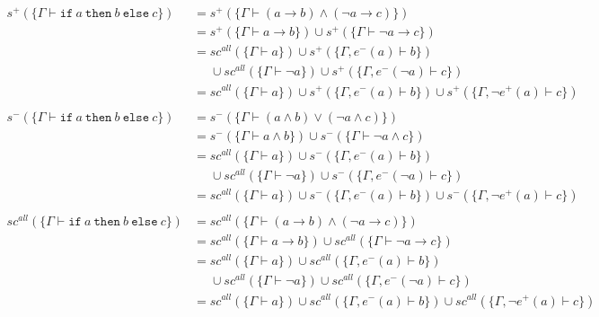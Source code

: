 \documentclass[12pt]{article}
\newcommand{\oif}{\texttt{if}~}
\newcommand{\othen}{~\texttt{then}~}
\newcommand{\oelse}{~\texttt{else}~}
\begin{document}
\begin{align*}
  s^+ (\{\Gamma \vdash \oif a \othen b \oelse c\})
   & = s^+ (\{\Gamma \vdash (a \rightarrow b) \land (\neg a \rightarrow c)\})                                                        \\
   & = s^+ (\{\Gamma \vdash a \rightarrow b\}) \cup s^+ (\{\Gamma \vdash \neg a \rightarrow c\})                                     \\
   & = sc^{all} (\{\Gamma \vdash a\}) \cup s^+ (\{\Gamma, e^- (a) \vdash b\})                                                        \\
   & \phantom{ = {}}{} \cup sc^{all} (\{\Gamma \vdash \neg a\}) \cup s^+ (\{\Gamma, e^- (\neg a) \vdash c\})                         \\
   & = sc^{all} (\{\Gamma \vdash a\}) \cup s^+ (\{\Gamma, e^- (a) \vdash b\}) \cup s^+ (\{\Gamma, \neg e^+ (a) \vdash c\})           \\
  \\
  s^- (\{\Gamma \vdash \oif a \othen b \oelse c\})
   & = s^- (\{\Gamma \vdash (a \land b) \lor (\neg a \land c)\})                                                                     \\
   & = s^- (\{\Gamma \vdash a \land b\}) \cup s^- (\{\Gamma \vdash \neg a \land c\})                                                 \\
   & = sc^{all} (\{\Gamma \vdash a\}) \cup s^- (\{\Gamma, e^- (a)\vdash b\})                                                         \\
   & \phantom{ = {}}{} \cup sc^{all} (\{\Gamma \vdash \neg a\}) \cup s^- (\{\Gamma, e^- (\neg a)\vdash c\})                          \\
   & = sc^{all} (\{\Gamma \vdash a\}) \cup s^- (\{\Gamma, e^- (a)\vdash b\}) \cup s^- (\{\Gamma, \neg e^+ (a)\vdash c\})             \\
  \\
  sc^{all} (\{\Gamma \vdash \oif a \othen b \oelse c\})
   & = sc^{all} (\{\Gamma \vdash (a \rightarrow b) \land (\neg a \rightarrow c)\})                                                   \\
   & = sc^{all} (\{\Gamma \vdash a \rightarrow b\}) \cup sc^{all} (\{\Gamma \vdash \neg a \rightarrow c\})                           \\
   & = sc^{all} (\{\Gamma \vdash a\}) \cup sc^{all} (\{\Gamma, e^- (a) \vdash b\})                                                   \\
   & \phantom{ = {}}{} \cup sc^{all} (\{\Gamma \vdash \neg a \}) \cup sc^{all} (\{\Gamma, e^- (\neg a ) \vdash c\})                  \\
   & = sc^{all} (\{\Gamma \vdash a\}) \cup sc^{all} (\{\Gamma, e^- (a) \vdash b\}) \cup sc^{all} (\{\Gamma, \neg e^+ (a) \vdash c\}) \\
\end{align*}
\end{document}

